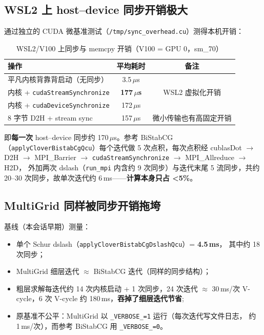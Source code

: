 \documentclass[11pt,a4paper]{article}
\begin{document}
\subsection{WSL2 上 host--device 同步开销极大}
\label{sec:sync-cost}

通过独立的 CUDA 微基准测试（\texttt{/tmp/sync\_overhead.cu}）测得本机开销：

\begin{table}[h]
\centering
\begin{tabular}{lcc}
\toprule
操作 & 平均耗时 & 备注 \\
\midrule
平凡内核背靠背启动（无同步） & 3.5\,$\mu$s & \\
内核 + \texttt{cudaStreamSynchronize} & \textbf{177\,$\mu$s} & WSL2 虚拟化开销 \\
内核 + \texttt{cudaDeviceSynchronize} & 172\,$\mu$s & \\
8 字节 D2H + stream sync & 157\,$\mu$s & 微小传输也有高固定开销 \\
\bottomrule
\end{tabular}
\caption{WSL2/V100 上同步与 memcpy 开销（V100 = GPU 0，sm\_70）}
\end{table}

即\textbf{每一次} host--device 同步约 170\,$\mu$s。参考 BiStabCG
（\texttt{applyCloverBistabCgQcu}）每个迭代做 5 次点积，每次点积经
cublasDot $\rightarrow$ D2H $\rightarrow$ MPI\_Barrier $\rightarrow$
\texttt{cudaStreamSynchronize} $\rightarrow$ MPI\_Allreduce $\rightarrow$ H2D，
外加两次 dslash（\texttt{run\_mpi} 内含约 9 次同步）与迭代末尾 5 流同步，共约
20--30 次同步，故单次迭代约 6\,ms——\textbf{计算本身只占 <5\%}。

\subsection{MultiGrid 同样被同步开销拖垮}
\label{sec:mg-sync}

基线（本会话早期）测量：
\begin{itemize}
  \item 单个 Schur dslash（\texttt{applyCloverBistabCgDslashQcu}）= \textbf{4.5\,ms}，
        其中约 18 次同步；
  \item MultiGrid 细层迭代 $\approx$ BiStabCG 迭代（同样的同步结构）；
  \item 粗层求解每迭代约 14 次内核启动 + 1 次同步，24 次迭代 $\approx$ 30\,ms/次
        V-cycle，6 次 V-cycle 约 180\,ms，\textbf{吞掉了细层迭代节省};
  \item 原基准不公平：MultiGrid 以 \texttt{\_VERBOSE\_=1} 运行（每次迭代写文件日志，
        约 1\,ms/次），而参考 BiStabCG 用 \texttt{\_VERBOSE\_=0}。
\end{itemize}
\end{document}
